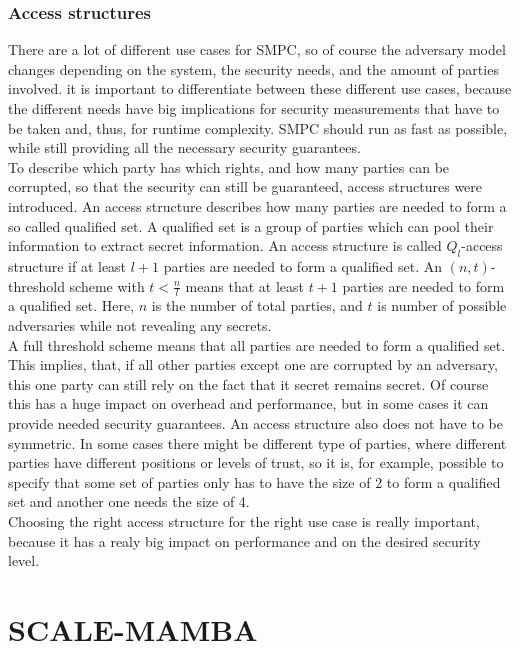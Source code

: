 \documentclass[english,runningheads,a4paper]{llncs}[2018/03/10]
\begin{document}
\subsubsection{Access structures}
There are a lot of different use cases for SMPC, so of course the adversary model changes depending on the system, the security needs, and the amount of parties involved. it is important to differentiate between these different use cases, because the different needs have big implications for security measurements that have to be taken and, thus, for runtime complexity. SMPC should run as fast as possible, while still providing all the necessary security guarantees.\\
To describe which party has which rights, and how many parties can be corrupted, so that the security can still be guaranteed, access structures were introduced.
An access structure describes how many parties are needed to form a so called qualified set. A qualified set is a group of parties which can pool their information to extract secret information. An access structure is called \(Q_l \)-access structure if at least \(l+1\) parties are needed to  form a qualified set. 
An \((n,t)\)-threshold scheme with \(t<\frac{n}{l}\) means that at least \(t+1\) parties are needed to form a qualified set. Here, \(n\) is the number of total parties, and \(t\) is number of possible adversaries while not revealing any secrets.\\
A full threshold scheme means that all parties are needed to form a qualified set. This implies, that, if all other parties except one are corrupted by an adversary, this one party can still rely on the fact that it secret remains secret. Of course this has a huge impact on overhead and performance, but in some cases it can provide needed security guarantees.
An access structure also does not have to be symmetric. In some cases there might be different type of parties, where different parties have different positions or levels of trust, so it is, for example, possible to specify that some set of parties only has to have the size of 2 to form a qualified set and another one needs the size of 4.\\
Choosing the right access structure for the right use case is really important, because it has a realy big impact on performance and on the desired security level.


\section{SCALE-MAMBA}\label{sec:scalemamba}
\end{document}
